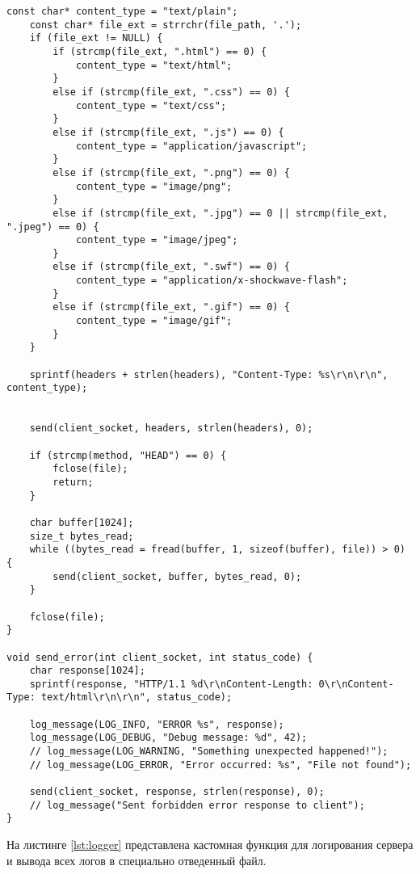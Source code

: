 \documentclass{bmstu}
\begin{document}
\begin{lstlisting}[caption={Обработка HTTP-ответов}, label=lst:response]
    const char* content_type = "text/plain";
    const char* file_ext = strrchr(file_path, '.');
    if (file_ext != NULL) {
        if (strcmp(file_ext, ".html") == 0) {
            content_type = "text/html";
        }
        else if (strcmp(file_ext, ".css") == 0) {
            content_type = "text/css";
        }
        else if (strcmp(file_ext, ".js") == 0) {
            content_type = "application/javascript";
        }
        else if (strcmp(file_ext, ".png") == 0) {
            content_type = "image/png";
        }
        else if (strcmp(file_ext, ".jpg") == 0 || strcmp(file_ext, ".jpeg") == 0) {
            content_type = "image/jpeg";
        }
        else if (strcmp(file_ext, ".swf") == 0) {
            content_type = "application/x-shockwave-flash";
        }
        else if (strcmp(file_ext, ".gif") == 0) {
            content_type = "image/gif";
        }
    }

    sprintf(headers + strlen(headers), "Content-Type: %s\r\n\r\n", content_type);


    send(client_socket, headers, strlen(headers), 0);

    if (strcmp(method, "HEAD") == 0) {
        fclose(file);
        return;
    }

    char buffer[1024];
    size_t bytes_read;
    while ((bytes_read = fread(buffer, 1, sizeof(buffer), file)) > 0) {
        send(client_socket, buffer, bytes_read, 0);
    }

    fclose(file);
}

void send_error(int client_socket, int status_code) {
    char response[1024];
    sprintf(response, "HTTP/1.1 %d\r\nContent-Length: 0\r\nContent-Type: text/html\r\n\r\n", status_code);

    log_message(LOG_INFO, "ERROR %s", response);
    log_message(LOG_DEBUG, "Debug message: %d", 42);
    // log_message(LOG_WARNING, "Something unexpected happened!");
    // log_message(LOG_ERROR, "Error occurred: %s", "File not found");

    send(client_socket, response, strlen(response), 0);
    // log_message("Sent forbidden error response to client");
}
\end{lstlisting}

На листинге \ref{lst:logger} представлена кастомная функция для логирования сервера и вывода всех логов в специально отведенный файл.
\end{document}
